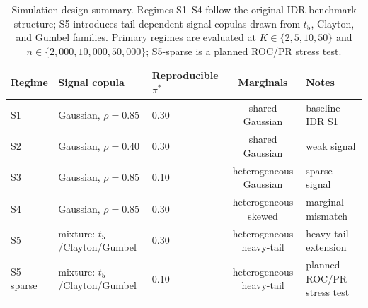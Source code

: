\begin{table}[H]
\centering
\caption{Simulation design summary. Regimes S1--S4 follow the original IDR benchmark structure; S5 introduces tail-dependent signal copulas drawn from $t_5$, Clayton, and Gumbel families. Primary regimes are evaluated at $K\in\{2,5,10,50\}$ and $n\in\{2{,}000,10{,}000,50{,}000\}$; S5-sparse is a planned ROC/PR stress test.}
\label{tab:sim-design}
\small
\setlength{\tabcolsep}{3pt}
\begin{tabularx}{\textwidth}{lYYcY}
\toprule
Regime & Signal copula & Reproducible $\pi^*$ & Marginals & Notes \\
\midrule
S1 & Gaussian, $\rho=0.85$ & 0.30 & shared Gaussian & baseline IDR S1 \\
S2 & Gaussian, $\rho=0.40$ & 0.30 & shared Gaussian & weak signal \\
S3 & Gaussian, $\rho=0.85$ & 0.10 & heterogeneous Gaussian & sparse signal \\
S4 & Gaussian, $\rho=0.85$ & 0.30 & heterogeneous skewed & marginal mismatch \\
S5 & mixture: $t_5$/Clayton/Gumbel & 0.30 & heterogeneous heavy-tail & heavy-tail extension \\
S5-sparse & mixture: $t_5$/Clayton/Gumbel & 0.10 & heterogeneous heavy-tail & planned ROC/PR stress test \\
\bottomrule
\end{tabularx}
\end{table}
